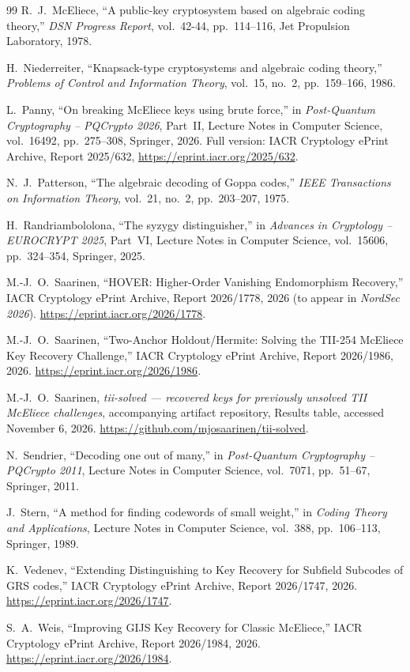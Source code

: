 \documentclass[11pt,a4paper]{article}
\theoremstyle{definition}
\theoremstyle{remark}
\begin{document}
\begin{thebibliography}{99}
R.~J.~McEliece,
``A public-key cryptosystem based on algebraic coding theory,'' \emph{DSN Progress Report}, vol.~42-44, pp.~114--116, Jet Propulsion Laboratory, 1978.

H.~Niederreiter,
``Knapsack-type cryptosystems and algebraic coding theory,'' \emph{Problems of Control and Information Theory}, vol.~15, no.~2, pp.~159--166, 1986.

L.~Panny,
``On breaking McEliece keys using brute force,'' in \emph{Post-Quantum Cryptography -- PQCrypto 2026}, Part~II, Lecture Notes in Computer Science, vol.~16492, pp.~275--308, Springer, 2026. Full version: IACR Cryptology ePrint Archive, Report 2025/632, \url{https://eprint.iacr.org/2025/632}.

N.~J.~Patterson,
``The algebraic decoding of Goppa codes,'' \emph{IEEE Transactions on Information Theory}, vol.~21, no.~2, pp.~203--207, 1975.

H.~Randriambololona,
``The syzygy distinguisher,'' in \emph{Advances in Cryptology -- EUROCRYPT 2025}, Part~VI, Lecture Notes in Computer Science, vol.~15606, pp.~324--354, Springer, 2025.

M.-J.~O.~Saarinen,
``HOVER: Higher-Order Vanishing Endomorphism Recovery,'' IACR Cryptology ePrint Archive, Report 2026/1778, 2026 (to appear in \emph{NordSec 2026}). \url{https://eprint.iacr.org/2026/1778}.

M.-J.~O.~Saarinen,
``Two-Anchor Holdout/Hermite: Solving the TII-254 McEliece Key Recovery Challenge,'' IACR Cryptology ePrint Archive, Report 2026/1986, 2026. \url{https://eprint.iacr.org/2026/1986}.

M.-J.~O.~Saarinen,
\emph{tii-solved --- recovered keys for previously unsolved TII McEliece challenges}, accompanying artifact repository, Results table, accessed November 6, 2026. \url{https://github.com/mjosaarinen/tii-solved}.

N.~Sendrier,
``Decoding one out of many,'' in \emph{Post-Quantum Cryptography -- PQCrypto 2011}, Lecture Notes in Computer Science, vol.~7071, pp.~51--67, Springer, 2011.

J.~Stern,
``A method for finding codewords of small weight,'' in \emph{Coding Theory and Applications}, Lecture Notes in Computer Science, vol.~388, pp.~106--113, Springer, 1989.

K.~Vedenev,
``Extending Distinguishing to Key Recovery for Subfield Subcodes of GRS codes,'' IACR Cryptology ePrint Archive, Report 2026/1747, 2026. \url{https://eprint.iacr.org/2026/1747}.

S.~A.~Weis,
``Improving GIJS Key Recovery for Classic McEliece,'' IACR Cryptology ePrint Archive, Report 2026/1984, 2026. \url{https://eprint.iacr.org/2026/1984}.

\end{thebibliography}
\end{document}
